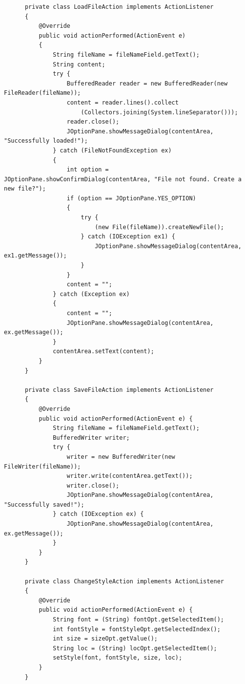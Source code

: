 \documentclass[11pt]{homework}
\begin{document}
\begin{lstlisting}
      private class LoadFileAction implements ActionListener
      {
          @Override
          public void actionPerformed(ActionEvent e)
          {
              String fileName = fileNameField.getText();
              String content;
              try {
                  BufferedReader reader = new BufferedReader(new FileReader(fileName));
                  content = reader.lines().collect
                      (Collectors.joining(System.lineSeparator()));
                  reader.close();
                  JOptionPane.showMessageDialog(contentArea, "Successfully loaded!");
              } catch (FileNotFoundException ex)
              {
                  int option = JOptionPane.showConfirmDialog(contentArea, "File not found. Create a new file?");
                  if (option == JOptionPane.YES_OPTION)
                  {
                      try {
                          (new File(fileName)).createNewFile();
                      } catch (IOException ex1) {
                          JOptionPane.showMessageDialog(contentArea, ex1.getMessage());
                      }
                  }
                  content = "";
              } catch (Exception ex)
              {
                  content = "";
                  JOptionPane.showMessageDialog(contentArea, ex.getMessage());
              }
              contentArea.setText(content);
          }
      }
  
      private class SaveFileAction implements ActionListener
      {
          @Override
          public void actionPerformed(ActionEvent e) {
              String fileName = fileNameField.getText();
              BufferedWriter writer;
              try {
                  writer = new BufferedWriter(new FileWriter(fileName));
                  writer.write(contentArea.getText());
                  writer.close();
                  JOptionPane.showMessageDialog(contentArea, "Successfully saved!");
              } catch (IOException ex) {
                  JOptionPane.showMessageDialog(contentArea, ex.getMessage());
              }
          }
      }
  
      private class ChangeStyleAction implements ActionListener
      {
          @Override
          public void actionPerformed(ActionEvent e) {
              String font = (String) fontOpt.getSelectedItem();
              int fontStyle = fontStyleOpt.getSelectedIndex();
              int size = sizeOpt.getValue();
              String loc = (String) locOpt.getSelectedItem();
              setStyle(font, fontStyle, size, loc);
          }
      }
  

\end{lstlisting}
\end{document}
